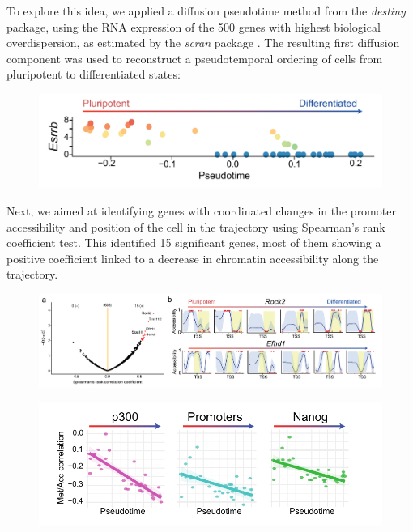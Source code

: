 To explore this idea, we applied a diffusion pseudotime method from the \textit{destiny} package\cite{Haghverdi2016}, using the RNA expression of the 500 genes with highest biological overdispersion, as estimated by the \textit{scran} package \cite{Lun2016}. The resulting first diffusion component was used to reconstruct a pseudotemporal ordering of cells from pluripotent to differentiated states:

\begin{figure}[H]
	\centering
	\includegraphics[width=0.9\linewidth]{scNMT_pseudotime}
	\caption[]{}
	\label{fig:scnmt_pseudotime}
\end{figure}


Next, we aimed at identifying genes with coordinated changes in the promoter accessibility and position of the cell in the trajectory using Spearman’s rank coefficient test. This identified 15 significant genes, most of them showing a positive coefficient linked to a decrease in chromatin accessibility along the trajectory.

\begin{figure}[H]
	\centering
	\includegraphics[width=0.9\linewidth]{scNMT_pseudotime_correlation}
	\caption[]{}
	\label{fig:scnmt_pseudotime_correlation}
\end{figure}



\begin{figure}[H]
	\centering
	\includegraphics[width=0.9\linewidth]{scNMT_pseudotime_coupling}
	\caption[]{}
	\label{fig:scnmt_pseudotime_coupling}
\end{figure}